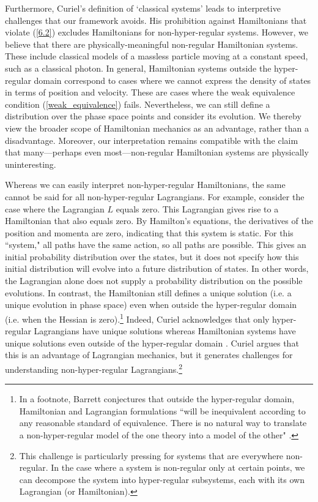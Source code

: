 \documentclass[letterpaper]{article}
\begin{document}
Furthermore, Curiel's definition of `classical systems' leads to interpretive challenges that our framework avoids. His prohibition against Hamiltonians that violate (\ref{6.2}) excludes Hamiltonians for non-hyper-regular systems. However, we believe that there are physically-meaningful non-regular Hamiltonian systems. These include classical models of a massless particle moving at a constant speed, such as a classical photon. In general, Hamiltonian systems outside the hyper-regular domain correspond to cases where we cannot express the density of states in terms of position and velocity. These are cases where the weak equivalence condition (\ref{weak_equivalence}) fails. Nevertheless, we can still define a distribution over the phase space points and consider its evolution. We thereby view the broader scope of Hamiltonian mechanics as an advantage, rather than a disadvantage. Moreover, our interpretation remains compatible with the claim that many---perhaps even most---non-regular Hamiltonian systems are physically uninteresting.

Whereas we can easily interpret non-hyper-regular Hamiltonians, the same cannot be said for all non-hyper-regular Lagrangians. For example, consider the case where the Lagrangian $L$ equals zero. This Lagrangian gives rise to a Hamiltonian that also equals zero. By Hamilton's equations, the derivatives of the position and momenta are zero, indicating that this system is static. For this ``system," all paths have the same action, so all paths are possible. This gives an initial probability distribution over the states, but it does not specify how this initial distribution will evolve into a future distribution of states. In other words, the Lagrangian alone does not supply a probability distribution on the possible evolutions. In contrast, the Hamiltonian still defines a unique solution (i.e. a unique evolution in phase space) even when outside the hyper-regular domain (i.e. when the Hessian is zero).\footnote{In a footnote, Barrett conjectures that outside the hyper-regular domain, Hamiltonian and Lagrangian formulations ``will be inequivalent according to any reasonable standard of equivalence. There is no natural way to translate a non-hyper-regular model of the one theory into a model of the other" \parencites*[1179]{Barrett2}.} Indeed, Curiel acknowledges that only hyper-regular Lagrangians have unique solutions whereas Hamiltonian systems have unique solutions even outside of the hyper-regular domain \parencites*[291, 308]{Curiel}. Curiel argues that this is an advantage of Lagrangian mechanics, but it generates challenges for understanding non-hyper-regular Lagrangians.\footnote{This challenge is particularly pressing for systems that are everywhere non-regular. In the case where a system is non-regular only at certain points, we can decompose the system into hyper-regular subsystems, each with its own Lagrangian (or Hamiltonian).}
\end{document}

